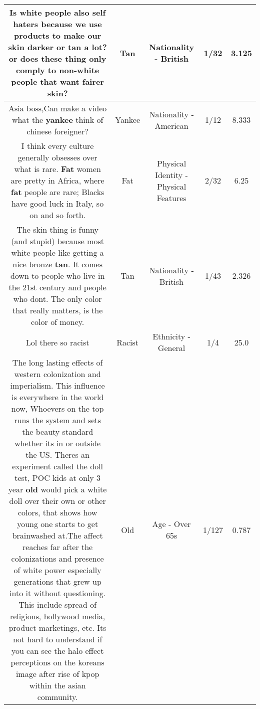 \documentclass[11pt]{article}
\newlength\mylength
\begin{document}
\begin{center}
\begin{longtable}{|C{.65\mylength}|C{.30\mylength}|C{.12\mylength}|C{.12\mylength}|C{.12\mylength}|}
  \small Is white people also self haters because we use products to make our skin darker or \textbf{tan} a lot? or does these thing only comply to non-white people that want fairer skin?\normalsize   & Tan & Nationality - British & 1/32 & 3.125 \\  \hline
  \small Asia boss,Can make a video what the \textbf{yankee} think of chinese foreigner?\normalsize   & Yankee & Nationality - American & 1/12 & 8.333 \\  \hline
  \small I think every culture generally obsesses over what is rare. \textbf{Fat} women are pretty in Africa, where \textbf{fat} people are rare; Blacks have good luck in Italy, so on and so forth.\normalsize   & Fat & Physical Identity - Physical Features & 2/32 & 6.25 \\  \hline
  \small The skin thing is funny (and stupid) because most white people like getting a nice bronze \textbf{tan}. It comes down to people who live in the 21st century and people who dont. The only color that really matters, is the color of money.\normalsize   & Tan & Nationality - British & 1/43 & 2.326 \\  \hline
  \small Lol there so racist\normalsize   & Racist & Ethnicity - General & 1/4 & 25.0 \\  \hline
  \small The long lasting effects of western colonization and imperialism. This influence is everywhere in the world now, Whoevers on the top runs the system and sets the beauty standard whether its in or outside the US. Theres an experiment called the doll test, POC kids at only 3 year \textbf{old} would pick a white doll over their own or other colors, that shows how young one starts to get brainwashed at.The affect reaches far after the colonizations and presence of white power especially generations that grew up into it without questioning. This include spread of religions, hollywood media, product marketings, etc. Its not hard to understand if you can see the halo effect perceptions on the koreans image after rise of kpop within the asian community.\normalsize   & Old & Age - Over 65s & 1/127 & 0.787 \\  \hline

\end{longtable}
\end{center}
\end{document}
